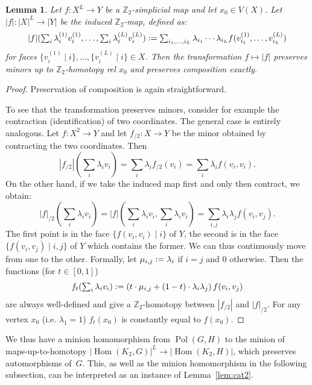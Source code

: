 \documentclass[11pt,a4paper]{scrartcl}
\numberwithin{theorem}{section}
\newtheorem{lemma}[theorem]{Lemma}
\theoremstyle{definition}
\newcommand{\ZZ}{\mathbb{Z}}
\newcommand{\defeq}{\vcentcolon=}
\DeclareMathOperator{\Pol}{Pol}
\DeclareMathOperator{\Hom}{Hom}
\begin{document}
\begin{lemma}\label{lem:minionHTop}
	Let $f \colon X^L \to Y$ be a $\ZZ_2$-simplicial map and let $x_0 \in V(X)$.
	Let $|f| \colon |X|^L \to |Y|$ be the induced $\ZZ_2$-map, defined as:
	$$\textstyle|f|(\sum_i \lambda^{(1)}_i v^{(1)}_i, \dots, \sum_i \lambda^{(L)}_i v^{(L)}_i) \defeq \sum_{i_1,\dots,i_L} \lambda_{i_1}\cdots \lambda_{i_L} f(v^{(1)}_{i_1},\dots,v^{(L)}_{i_L})$$
	for faces $\{v^{(1)}_i \mid i\}, \dots, \{v^{(L)}_i \mid i\} \in X$.
	Then the transformation $f \mapsto |f|$ preserves minors up to $\ZZ_2$-homotopy rel $x_0$ and preserves composition exactly.
\end{lemma}
\begin{proof}
	Preservation of composition is again straightforward.
	
	To see that the transformation preserves minors, consider for example the contraction (identification) of two coordinates.
	The general case is entirely analogous.
	Let $f \colon X^2 \to Y$ and let $f_{/2} \colon X \to Y$ be the minor obtained by contracting the two coordinates.
	Then 
	$$\textstyle |f_{/2}|(\sum_i \lambda_i v_i) = \sum_i \lambda_i f_{/2}(v_i) = \sum_i \lambda_i f(v_i, v_i).$$
	On the other hand, if we take the induced map first and only then contract, we obtain:
	$$\textstyle |f|_{/2}(\sum_i \lambda_i v_i) = |f|(\sum_i \lambda_i v_i, \sum_i \lambda_i v_i) = \sum_{i,j} \lambda_i \lambda_j f(v_i, v_j).$$
	The first point is in the face $\{f(v_i,v_i) \mid i\}$ of $Y$,
	the second is in the face $\{f(v_i,v_j) \mid i,j\}$ of $Y$ which contains the former.
	We can thus continuously move from one to the other.
	Formally, let $\mu_{i,j} \defeq \lambda_i$ if $i=j$ and $0$ otherwise.
	Then the functions (for $t \in [0,1]$)
	$$\textstyle f_t(\sum_i \lambda_i v_i) \defeq \left(t \cdot \mu_{i,j} + (1-t)\cdot \lambda_i \lambda_j\right) f(v_i,v_j)$$
	are always well-defined and give a $\ZZ_2$-homotopy between $|f_{/2}|$ and $|f|_{/2}$.
	For any vertex $x_0$ (i.e. $\lambda_1=1$) $f_t(x_0)$ is constantly equal to $f(x_0)$.
\end{proof}

We thus have a minion homomorphism from $\Pol(G,H)$ to the minion of maps-up-to-homotopy $|\Hom(K_2,G)|^L \to |\Hom(K_2,H)|$, which preserves automorphisms of~$G$.
This, as well as the minion homomorphism in the following subsection, can be interpreted as an instance of Lemma~\ref{lem:cat2}.
\end{document}
